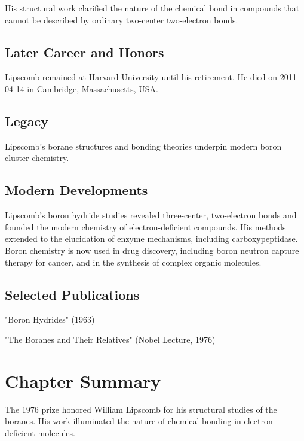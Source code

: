 His structural work clarified the nature of the chemical bond in compounds that cannot be described by ordinary two-center two-electron bonds.

\subsection*{Later Career and Honors}

Lipscomb remained at Harvard University until his retirement. He died on 2011-04-14 in Cambridge, Massachusetts, USA.

\subsection*{Legacy}

Lipscomb's borane structures and bonding theories underpin modern boron cluster chemistry.

\subsection*{Modern Developments}

Lipscomb's boron hydride studies revealed three-center, two-electron bonds and founded the modern chemistry of electron-deficient compounds. His methods extended to the elucidation of enzyme mechanisms, including carboxypeptidase. Boron chemistry is now used in drug discovery, including boron neutron capture therapy for cancer, and in the synthesis of complex organic molecules.

\subsection*{Selected Publications}

"Boron Hydrides" (1963)

"The Boranes and Their Relatives" (Nobel Lecture, 1976)

\clearpage

\section*{Chapter Summary}

The 1976 prize honored William Lipscomb for his structural studies of the boranes. His work illuminated the nature of chemical bonding in electron-deficient molecules.

